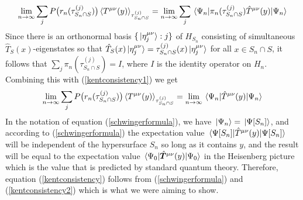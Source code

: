 \begin{equation}\label{kentconsistency1}
\lim_{n\rightarrow\infty}\sum_jP\big(r_n(\tau^{(j)}_{S_n\cap S})\big)\ev*{T^{\mu\nu}(y)}_{\tau^{(j)}_{S_n\cap S}}=\lim_{n\rightarrow\infty}\sum_{j}{\ev*{\pi_{n}(\tau^{(j)}_{S_n\cap S})\hat{T}^{\mu\nu}(y)}{\Psi_n}}
\end{equation}
Since there is an orthonormal basis $\{\ket*{\eta_j^{\mu\nu}}:j\}$ of $H_{S_n}$ consisting of simultaneous $\hat{T}_S(x)$-eigenstates so that $\hat{T}_S(x)\ket*{\eta_j^{\mu\nu}}=\tau^{(j)}_{S_n\cap S}(x)\ket*{\eta_j^{\mu\nu}}$ for all $x\in S_n\cap S$, it follows that $\sum_j \pi_{n}(\tau^{(j)}_{S_n\cap S})=I$, where $I$ is the identity operator on $H_n$. Combining this with (\ref{kentconsistency1}) we get
\begin{equation}\label{kentconsistency2}
	\lim_{n\rightarrow\infty}\sum_jP\big(r_n(\tau^{(j)}_{S_n\cap S})\big)\ev*{T^{\mu\nu}(y)}_{\tau^{(j)}_{S_n\cap S}}=\lim_{n\rightarrow\infty}\ev*{\hat{T}^{\mu\nu}(y)}{\Psi_n}
	\end{equation}
In the notation of equation (\ref{schwingerformula}), we have $\ket*{\Psi_n}=\ket*{\Psi[S_n]}$, %
%
and according to (\ref{schwingerformula}) the expectation value $\ev*{\hat{T}^{\mu\nu}(y)}{\Psi[S_n]}$ will be independent of the hypersurface $S_n$ so long as it contains $y$, and the result will be equal to the expectation value $\ev*{\hat{\bm{T}}^{\mu\nu}(y)}{\Psi_0}$ in the Heisenberg picture which is the value that is predicted by standard quantum theory. Therefore, equation (\ref{kentconsistency}) follows from (\ref{schwingerformula}) and (\ref{kentconsistency2}) which is what we were aiming to show.

